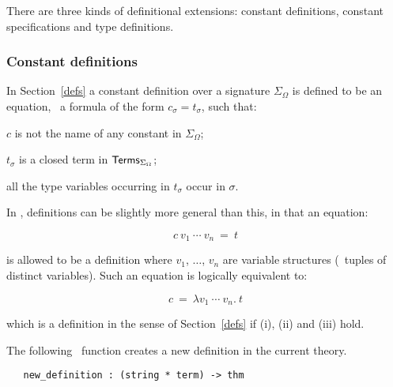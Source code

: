 There are three kinds of definitional extensions:
constant definitions, constant specifications and type definitions.

\subsubsection{Constant definitions}
\label{sec:constant-definitions}

In Section~\ref{defs} a constant definition
over a signature $\Sigma_{\Omega}$ is defined to be
an equation, \ie\ a formula of the form $c_{\sigma}=t_{\sigma}$,
such that:
\begin{myenumerate}
\item $c$ is not the name of any constant in $\Sigma_{\Omega}$;
\item $t_{\sigma}$ is a closed term in ${\sf Terms}_{\Sigma_{\Omega}}$;
\item all the type variables occurring in $t_{\sigma}$ occur in $\sigma$.
\end{myenumerate}

In \HOL, definitions can be slightly more general than this, in that
an equation:

\[ c\ v_1\ \cdots\ v_n\ =\ t \]

\noindent is  allowed  to  be a  definition where  $v_1$, $\dots$, $v_n$ are
variable structures (\ie\ tuples of distinct variables).   Such  an equation is
logically equivalent to:

\[ c\ =\ \lambda v_1\ \cdots\ v_n.\  t \]

\noindent which is a definition in the sense of  Section~\ref{defs} if (i),
(ii) and (iii) hold.

The following  \ML\ function  creates a  new definition in
the current theory.

\begin{boxed}
\begin{verbatim}
   new_definition : (string * term) -> thm
\end{verbatim}\end{boxed}


